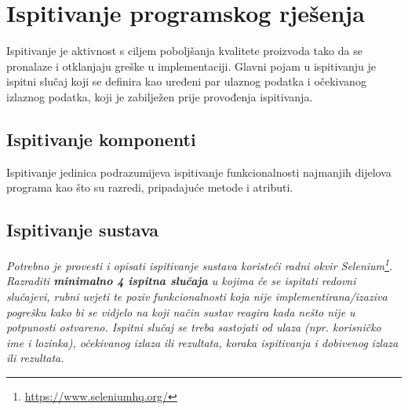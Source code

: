 			\eject 
		
	
		\section{Ispitivanje programskog rješenja}
			
			
			 
			 Ispitivanje je aktivnost s ciljem poboljšanja kvalitete proizvoda tako da se pronalaze i otklanjaju greške u implementaciji. Glavni pojam u ispitivanju je ispitni slučaj koji se definira kao uređeni par ulaznog podatka i očekivanog izlaznog podatka, koji je zabilježen prije provođenja ispitivanja.
	
			
			\subsection{Ispitivanje komponenti}
			
			Ispitivanje jedinica podrazumijeva ispitivanje funkcionalnosti najmanjih dijelova programa kao što su razredi, pripadajuće metode i atributi.
			
			
			
			\subsection{Ispitivanje sustava}
			
			 \textit{Potrebno je provesti i opisati ispitivanje sustava koristeći radni okvir Selenium\footnote{\url{https://www.seleniumhq.org/}}. Razraditi \textbf{minimalno 4 ispitna slučaja} u kojima će se ispitati redovni slučajevi, rubni uvjeti te poziv funkcionalnosti koja nije implementirana/izaziva pogrešku kako bi se vidjelo na koji način sustav reagira kada nešto nije u potpunosti ostvareno. Ispitni slučaj se treba sastojati od ulaza (npr. korisničko ime i lozinka), očekivanog izlaza ili rezultata, koraka ispitivanja i dobivenog izlaza ili rezultata.\\ }
			 
